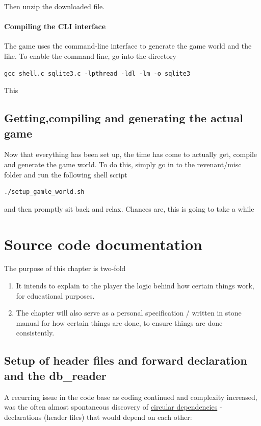 \documentclass{report}
\begin{document}
Then unzip the downloaded file.
\subsubsection*{Compiling the CLI interface}
The game uses the command-line interface to generate the game world and the like. To enable the command line, go into the directory
\begin{lstlisting}
gcc shell.c sqlite3.c -lpthread -ldl -lm -o sqlite3
\end{lstlisting}
This 
\section*{Getting,compiling and generating the actual game}
Now that everything has been set up, the time has come to actually get, compile and generate the game world. To do this, simply go in to the revenant/misc folder and run the following shell script
\begin{lstlisting}
./setup_gamle_world.sh
\end{lstlisting}
and then promptly sit back and relax. Chances are, this is going to take a while
\chapter{Source code documentation}
The purpose of this chapter is two-fold
\begin{enumerate}
\item It intends to explain to the player the logic behind how certain things work, for educational purposes.
\item The chapter will also serve as a personal specification / written in stone manual for how certain things are done, to ensure things are done consistently.
\end{enumerate}
\section*{Setup of header files and forward declaration and the db\_reader }
A recurring issue in the code base as coding continued and complexity increased, was the often almost spontaneous discovery of \underline{circular dependencies} - declarations (header files) that would depend on each other:
\end{document}
